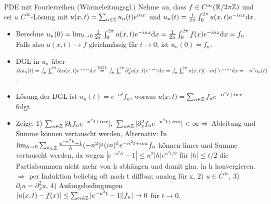 \begin{namedtheorem}{PDE mit Fourierreihen (Wärmeleitungsgl.)}
  Nehme an, dass $f\in C^{\infty}(\mathbb{R}/2\pi\mathbb{Z})$ und sei $u$ $C^{\infty}$-Lösung mit $u(x,t)=\sum_{n\in\mathbb{Z}}u_n(t)e^{inx}$ und $u_n(t)=\frac1{2\pi}\int_0^{2\pi}u(x,t)e^{-inx}\mathrm{d}x$. 
  \begin{itemize}
  \item Berechne $u_n(0) = \lim_{t\rightarrow0} \frac1{2\pi}\int_0^{2\pi} u(x,t) e^{-inx}\mathrm{d}x = \frac1{2\pi}\int_0^{2\pi} f(x) e^{-inx}\mathrm{d}x = f_n$. Falls also $u(x,t)\rightarrow f$ gleichmässig für $t\rightarrow0$, ist $u_n(0)=f_n$. 
  \item DGL in $u_n$ über $\partial_t u_n(t)=\frac1{2\pi}\int_0^{2\pi}\partial_tu(x,t)e^{-inx}\mathrm{d}x \overset{DGL}{=} \frac1{2\pi}\int_0^{2\pi}\partial^2_xu(x,t)e^{-inx}\mathrm{d}x = \frac1{2\pi}\int_0^{2\pi}u(x,t)(-in)^2e^{-inx}\mathrm{d}x=-n^2u_n(t)$.
  \item Lösung der DGL ist $u_n(t)=e^{-n^2}f_n$, woraus $u(x,t)=\sum_{n\in\mathbb{Z}}f_ne^{-n^2t+inx}$ folgt. 
  \item Zeige: 1) $\sum_{n\in\mathbb{Z}}|\partial_t f_ne^{-n^2t+inx}|,\ \sum_{n\in\mathbb{Z}}|\partial_x^2 f_ne^{-n^2t+inx}| < \infty \Rightarrow$ Ableitung und Summe können vertauscht werden,
  Alternativ: In $\lim_{h\rightarrow 0}\sum_{n\in\mathbb{Z}}\frac{e^{-n^2h}-1}h(-n^2)^j(in)^ke^{-n^2t+inx}f_n$ können limes und Summe vertauscht werden, da wegen $|e^{-n^2h}-1| \leq n^2|h|e^{n^2t/2}$ für $|h| \leq t/2$ die Partialsummen nicht mehr von h abhängen und damit glm. in h konvergieren. $\Rightarrow$ per Induktion beliebig oft nach t diffbar; analog für x, 2) $u\in C^{\infty}$, 3) $\partial_tu = \partial^2_xu$, 4) Anfangsbedingungen $|u(x,t)-f(x)|\leq\sum_{n\in\mathbb{Z}}|e^{-n^2t}-1||f_n|\rightarrow0$ für $t\rightarrow0$.
  \end{itemize}
\end{namedtheorem}

